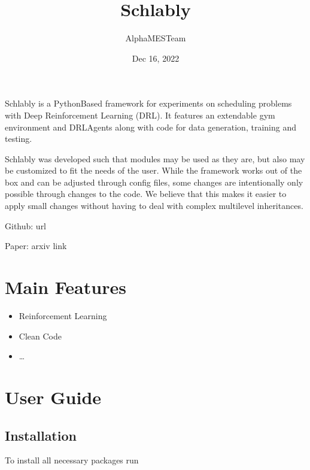 \documentclass[letterpaper,10pt,english]{sphinxmanual}
\title{Schlably}
\date{Dec 16, 2022}
\author{AlphaMES\sphinxhyphen{}Team}
\begin{document}
\pagestyle{empty}
\sphinxmaketitle
\pagestyle{plain}
\sphinxtableofcontents
\pagestyle{normal}
\label{\detokenize{index::doc}}


\sphinxAtStartPar
{}

\sphinxAtStartPar
Schlably is a Python\sphinxhyphen{}Based framework for experiments on scheduling problems with Deep Reinforcement Learning (DRL).
It features an extendable gym environment and DRL\sphinxhyphen{}Agents along with code for data generation, training and testing.

\sphinxAtStartPar
Schlably was developed such that modules may be used as they are, but also may be customized to fit the needs of the user.
While the framework works out of the box and can be adjusted through config files, some changes are intentionally only possible through changes to the code.
We believe that this makes it easier to apply small changes without having to deal with complex multi\sphinxhyphen{}level inheritances.

\sphinxAtStartPar
Github: url

\sphinxAtStartPar
Paper: arxiv link


\chapter{Main Features}
\label{\detokenize{index:main-features}}\begin{itemize}
\item {} 
\sphinxAtStartPar
Reinforcement Learning

\item {} 
\sphinxAtStartPar
Clean Code

\item {} 
\sphinxAtStartPar
…

\end{itemize}


\chapter{User Guide}
\label{\detokenize{index:user-guide}}

\section{Installation}
\label{\detokenize{installation:installation}}\label{\detokenize{installation::doc}}
\sphinxAtStartPar
To install all necessary packages run
\end{document}
